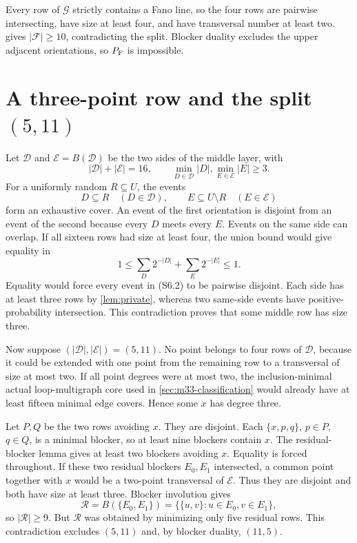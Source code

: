 \documentclass[11pt,a4paper]{article}
\theoremstyle{definition}
\newcommand{\blocker}{B}
\begin{document}
Every row of $\mathcal G$ strictly contains a Fano line, so the four rows are
pairwise intersecting, have size at least four, and have transversal number
at least two.   gives
$|\mathcal F|\geq10$, contradicting the split.  Blocker duality excludes the
upper adjacent orientations, so $P_{\rm F}$ is impossible.

\section{A three-point row and the split \texorpdfstring{$(5,11)$}{(5,11)}}
\label{sec:five-eleven}

Let $\mathcal D$ and $\mathcal E=\blocker(\mathcal D)$ be the two sides of
the middle layer, with
\[
 |\mathcal D|+|\mathcal E|=16,\qquad
 \min_{D\in\mathcal D}|D|,
 \min_{E\in\mathcal E}|E|\geq3.          \tag{S6.1}
\]
For a uniformly random $R\subseteq U$, the events
\[
 D\subseteq R\quad(D\in\mathcal D),\qquad
 E\subseteq U\setminus R\quad(E\in\mathcal E)             \tag{S6.2}
\]
form an exhaustive cover.  An event of the first orientation is disjoint
from an event of the second because every $D$ meets every $E$.  Events on
the same side can overlap.  If all sixteen rows had size at least four, the
union bound would give equality in
\[
 1\leq\sum_D2^{-|D|}+\sum_E2^{-|E|}\leq1.                 \tag{S6.3}
\]
Equality would force every event in (S6.2) to be pairwise disjoint.  Each
side has at least three rows by \cref{lem:private}, whereas two same-side
events have positive-probability intersection.  This contradiction proves
that some middle row has size three.

Now suppose $(|\mathcal D|,|\mathcal E|)=(5,11)$.  No point belongs to four
rows of $\mathcal D$, because it could be extended with one point from the
remaining row to a transversal of size at most two.  If all point degrees
were at most two, the inclusion-minimal actual loop-multigraph core used in
\cref{sec:m33-classification} would already have at least fifteen minimal
edge covers.  Hence some $x$ has degree three.

Let $P,Q$ be the two rows avoiding $x$.  They are disjoint.  Each
$\{x,p,q\}$, $p\in P$, $q\in Q$, is a minimal blocker, so at least nine
blockers contain $x$.  The residual-blocker lemma gives at least two blockers
avoiding $x$.  Equality is forced throughout.  If these two residual
blockers $E_0,E_1$ intersected, a common point together with $x$ would be a
two-point transversal of $\mathcal E$.  Thus they are disjoint and both have
size at least three.  Blocker involution gives
\[
 \mathcal R=\blocker(\{E_0,E_1\})
 =\{\{u,v\}:u\in E_0, v\in E_1\},
\]
so $|\mathcal R|\geq9$.  But $\mathcal R$ was obtained by minimizing only
five residual rows.  This contradiction excludes $(5,11)$ and, by blocker
duality, $(11,5)$.
\end{document}
